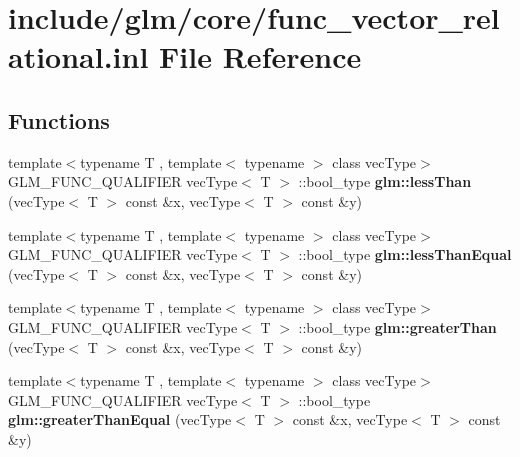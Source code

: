 \hypertarget{func__vector__relational_8inl}{\section{include/glm/core/func\-\_\-vector\-\_\-relational.inl \-File \-Reference}
\label{func__vector__relational_8inl}
}
\subsection*{\-Functions}
\begin{DoxyCompactItemize}
\item 
\hypertarget{namespaceglm_a5b27d627ccb73d8240b06f424fd08fd5}{{\footnotesize template$<$typename T , template$<$ typename $>$ class vec\-Type$>$ }\\\-G\-L\-M\-\_\-\-F\-U\-N\-C\-\_\-\-Q\-U\-A\-L\-I\-F\-I\-E\-R vec\-Type$<$ \-T $>$\*
\-::bool\-\_\-type {\bfseries glm\-::less\-Than} (vec\-Type$<$ \-T $>$ const \&x, vec\-Type$<$ \-T $>$ const \&y)}\label{namespaceglm_a5b27d627ccb73d8240b06f424fd08fd5}

\item 
\hypertarget{namespaceglm_a92e02a1a011a6f422168c390e51b273e}{{\footnotesize template$<$typename T , template$<$ typename $>$ class vec\-Type$>$ }\\\-G\-L\-M\-\_\-\-F\-U\-N\-C\-\_\-\-Q\-U\-A\-L\-I\-F\-I\-E\-R vec\-Type$<$ \-T $>$\*
\-::bool\-\_\-type {\bfseries glm\-::less\-Than\-Equal} (vec\-Type$<$ \-T $>$ const \&x, vec\-Type$<$ \-T $>$ const \&y)}\label{namespaceglm_a92e02a1a011a6f422168c390e51b273e}

\item 
\hypertarget{namespaceglm_acc3192e87d7bb57e9ebb0821b9348de7}{{\footnotesize template$<$typename T , template$<$ typename $>$ class vec\-Type$>$ }\\\-G\-L\-M\-\_\-\-F\-U\-N\-C\-\_\-\-Q\-U\-A\-L\-I\-F\-I\-E\-R vec\-Type$<$ \-T $>$\*
\-::bool\-\_\-type {\bfseries glm\-::greater\-Than} (vec\-Type$<$ \-T $>$ const \&x, vec\-Type$<$ \-T $>$ const \&y)}\label{namespaceglm_acc3192e87d7bb57e9ebb0821b9348de7}

\item 
\hypertarget{namespaceglm_a25c709f358e879e9fb7c338614c55d30}{{\footnotesize template$<$typename T , template$<$ typename $>$ class vec\-Type$>$ }\\\-G\-L\-M\-\_\-\-F\-U\-N\-C\-\_\-\-Q\-U\-A\-L\-I\-F\-I\-E\-R vec\-Type$<$ \-T $>$\*
\-::bool\-\_\-type {\bfseries glm\-::greater\-Than\-Equal} (vec\-Type$<$ \-T $>$ const \&x, vec\-Type$<$ \-T $>$ const \&y)}\label{namespaceglm_a25c709f358e879e9fb7c338614c55d30}


\end{DoxyCompactItemize}
